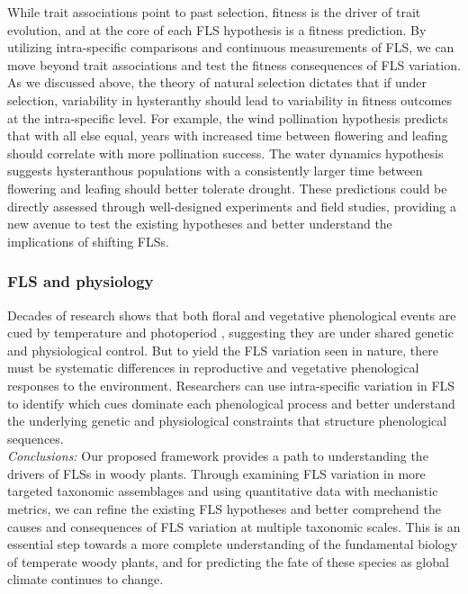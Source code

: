 \documentclass{article}
\begin{document}
{\noindent While trait associations point to past selection, fitness is the driver of trait evolution, and at the core of each FLS hypothesis is a fitness prediction. By utilizing intra-specific comparisons and continuous measurements of FLS, we can move beyond trait associations and test the fitness consequences of FLS variation. As we discussed above, the theory of natural selection dictates that if under selection, variability in hysteranthy should lead to variability in fitness outcomes at the intra-specific level. For example, the wind pollination hypothesis predicts that with all else equal, years with increased time between flowering and leafing should correlate with more pollination success. The water dynamics hypothesis suggests hysteranthous populations with a consistently larger time between flowering and leafing should better tolerate drought. These predictions could be directly assessed through well-designed experiments and field studies, providing a new avenue to test the existing hypotheses and better understand the implications of shifting FLSs.\\

\subsubsection*{FLS and physiology} 
Decades of research shows that both floral and vegetative phenological events are cued by temperature and photoperiod \citep{Forrest2010, Flynn2018}, suggesting they are under shared genetic and physiological control. But to yield the FLS variation seen in nature, there must be systematic differences in reproductive and vegetative phenological responses to the environment. Researchers can use intra-specific variation in FLS to identify which cues dominate each phenological process and better understand the underlying genetic and physiological constraints that structure phenological sequences.\\

\emph{Conclusions:} Our proposed framework provides a path to understanding the drivers of FLSs in woody plants. Through examining FLS variation in more targeted taxonomic assemblages and using quantitative data with mechanistic metrics, we can refine the existing FLS hypotheses and better comprehend the causes and consequences of FLS variation at multiple taxonomic scales. This is an essential step towards a more complete understanding of the fundamental biology of temperate woody plants, and for predicting the fate of these species as global climate continues to change.

}
\end{document}
